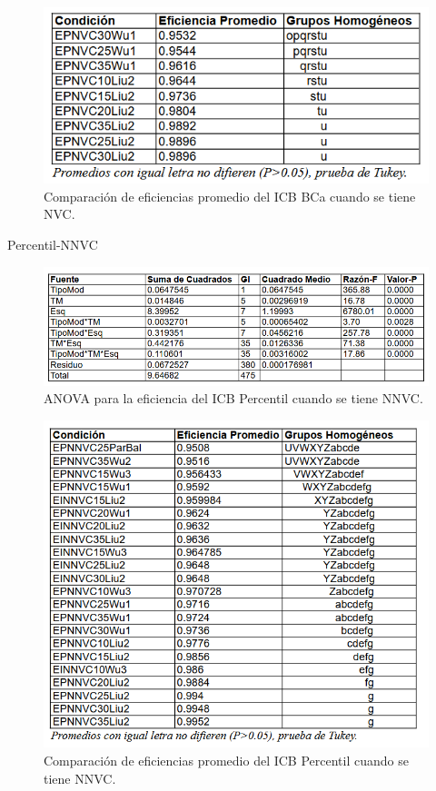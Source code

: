 \begin{figure}[ht] 
	\centering 
	\includegraphics[width=0.76\linewidth]{img/CompEfic_PromICB_BCa_NVC.png} 
	\caption{Comparación de eficiencias promedio del ICB BCa cuando se tiene NVC.} 
	\label{fig:CompEfic_PromICB_BCa_NVC}
\end{figure}
\FloatBarrier




Percentil-NNVC

\begin{figure}[ht] 
	\centering 
	\includegraphics[width=0.95\linewidth]{img/ANOVA_Efic_ICB_Perc_NNVC.png} 
	\caption{ANOVA para la eficiencia del ICB Percentil cuando se tiene NNVC.} 
	\label{fig:ANOVA_Efic_ICB_Perc_NNVC}
\end{figure}
\FloatBarrier


\begin{figure}[ht] 
	\centering 
	\includegraphics[width=0.76\linewidth]{img/CompEfic_PromICB_Perc_NNVC.png} 
	\caption{Comparación de eficiencias promedio del ICB Percentil cuando se tiene NNVC.} 
	\label{fig:CompEfic_PromICB_Perc_NNVC}
\end{figure}
\FloatBarrier



